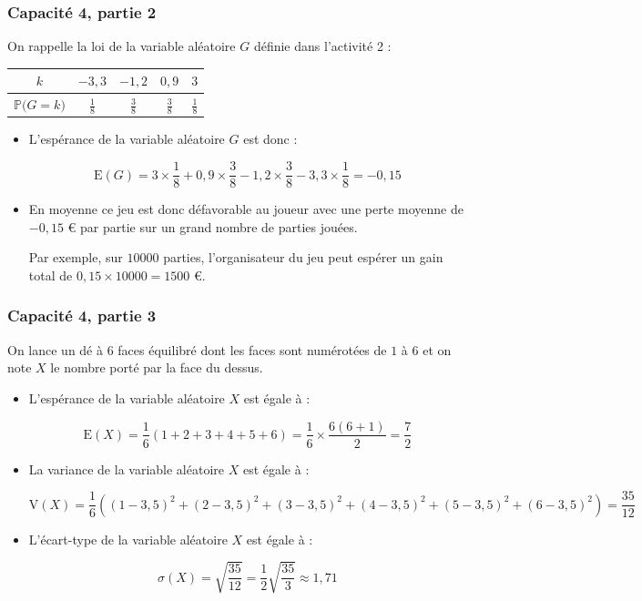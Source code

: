 \documentclass[11pt, hyperref={urlcolor=red,%
            linkcolor=blue, %
            colorlinks=true}]{beamer}
\newcommand{\proba}[1]{\mathbb{P}\big(#1\big)}
\begin{document}
\begin{frame}
\frametitle{Capacité 4,  partie 2}


On rappelle la loi de la variable aléatoire $G$ définie dans l'activité 2 :
	
	\begin{center}
	\begin{tabular}{|c|c|c|c|c|}
	\hline 
	$k$ & $-3,3$ & $-1,2$ & $0,9$ & $3$ \\ 
	\hline 
	$\proba{G=k}$ & $\frac{1}{8}$  & $\frac{3}{8}$ & $\frac{3}{8}$ & $\frac{1}{8}$ \\ 
	\hline 
	\end{tabular} 
	\end{center}

\begin{itemize}
	\pause \item L'espérance de la variable aléatoire $G$ est donc :

$$\text{E}(G)=3 \times \frac{1}{8} + 0,9 \times \frac{3}{8} -1,2 \times \frac{3}{8} -3,3 \times \frac{1}{8} = -0,15$$


	
	\pause \item  En moyenne ce jeu est donc défavorable au joueur avec une perte moyenne de $-0,15$ € par partie sur un grand nombre
de parties jouées.

Par exemple, sur $10000$ parties, l'organisateur du jeu peut espérer un gain total de $0,15 \times 10000 = 1500$ €.


	
\end{itemize}
	
\end{frame}



\begin{frame}
\frametitle{Capacité 4,  partie 3}


On lance un dé à $6$ faces équilibré dont les faces sont numérotées de $1$ à $6$ et on note $X$ le nombre porté par la face du dessus.
	

\begin{itemize}
	\pause \item L'espérance de la variable aléatoire $X$ est égale à  :

$$\text{E}(X)=\frac{1}{6}\left(1+2+3+4+5+6\right)=\frac{1}{6}\times \frac{6(6+1)}{2}=\frac{7}{2}$$


	
	\pause \item   La variance  de la variable aléatoire $X$ est égale à  :

$$\text{V}(X)=\frac{1}{6}\left((1-3,5)^{2}+(2-3,5)^{2}+(3-3,5)^{2}+(4-3,5)^{2}+(5-3,5)^{2}+(6-3,5)^{2}\right)=\frac{35}{12}$$ 

\pause \item   L'écart-type  de la variable aléatoire $X$ est égale à  :

$$\sigma(X)=\sqrt{\frac{35}{12}}=\frac{1}{2}\sqrt{\frac{35}{3}}\approx 1,71$$
	
\end{itemize}
	
	
\end{frame}
\end{document}
